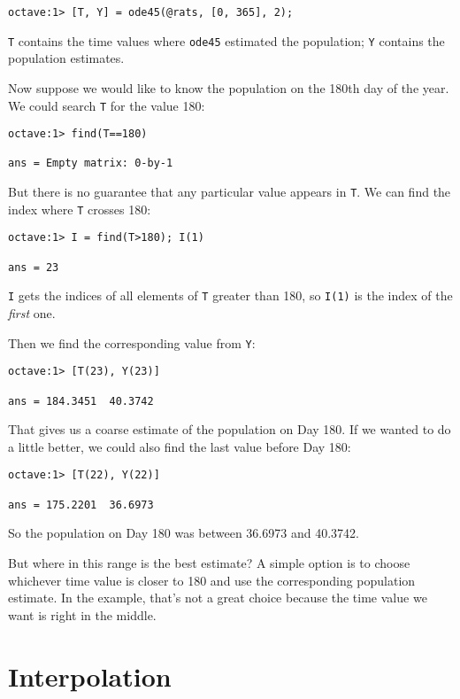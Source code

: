 \begin{verbatim}
octave:1> [T, Y] = ode45(@rats, [0, 365], 2);
\end{verbatim}

{\tt T} contains the time values where {\tt ode45} estimated the
population; {\tt Y} contains the population estimates.

Now suppose we would like to know the population on the 180th day
of the year. We could search {\tt T} for the value 180:

\begin{verbatim}
octave:1> find(T==180)

ans = Empty matrix: 0-by-1
\end{verbatim}

But there is no guarantee that any particular value appears in
{\tt T}. We can find the index where {\tt T} crosses 180:

\begin{verbatim}
octave:1> I = find(T>180); I(1)

ans = 23
\end{verbatim}

{\tt I} gets the indices of all elements of {\tt T} greater
than 180, so {\tt I(1)} is the index of the {\em first} one.

Then we find the corresponding value from {\tt Y}:

\begin{verbatim}
octave:1> [T(23), Y(23)]

ans = 184.3451  40.3742
\end{verbatim}

That gives us a coarse estimate of the population on Day 180.
If we wanted to do a little better, we could also find the last value
before Day 180:

\begin{verbatim}
octave:1> [T(22), Y(22)]

ans = 175.2201  36.6973
\end{verbatim}

So the population on Day 180 was between 36.6973 and 40.3742.

But where in this range is the best estimate? A simple option is to
choose whichever time value is closer to 180 and use the corresponding
population estimate. In the example, that's not a great choice
because the time value we want is right in the middle.


\section{Interpolation}

